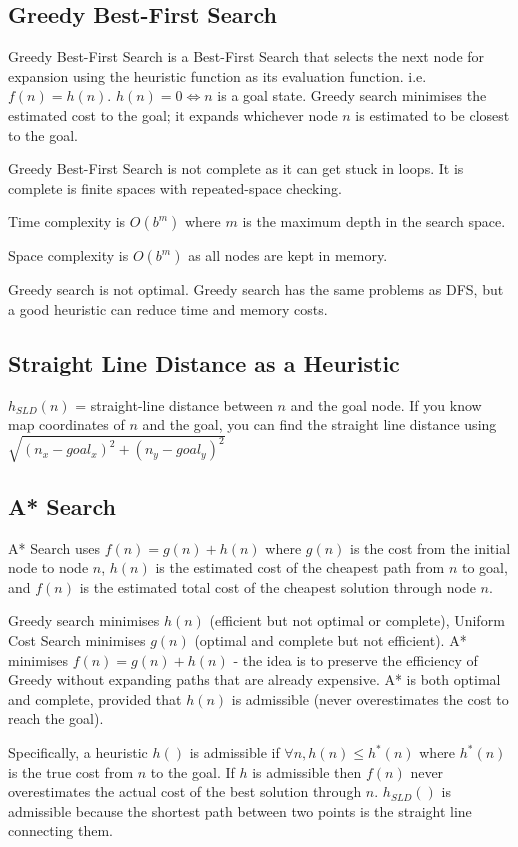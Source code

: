 \subsection{Greedy Best-First Search}
Greedy Best-First Search is a Best-First Search that selects the next node for
expansion using the heuristic function as its evaluation function. i.e. $f(n) =
h(n)$. $h(n) = 0 \Longleftrightarrow n$ is a goal state. Greedy search
minimises the estimated cost to the goal; it expands whichever node $n$ is
estimated to be closest to the goal.

Greedy Best-First Search is not complete as it can get stuck in loops. It is
complete is finite spaces with repeated-space checking.

Time complexity is $O(b^m)$ where $m$ is the maximum depth in the search space.

Space complexity is $O(b^m)$ as all nodes are kept in memory.

Greedy search is not optimal. Greedy search has the same problems as DFS, but a
good heuristic can reduce time and memory costs.

\subsection{Straight Line Distance as a Heuristic}
$h_{SLD}(n)$ = straight-line distance between $n$ and the goal node. If you
know map coordinates of $n$ and the goal, you can find the straight line
distance using $\sqrt{(n_x - goal_x)^2 + (n_y - goal_y)^2}$

\subsection{A* Search}
A* Search uses $f(n) = g(n) + h(n)$ where $g(n)$ is the cost from the initial
node to node $n$, $h(n)$ is the estimated cost of the cheapest path from $n$ to
goal, and $f(n)$ is the estimated total cost of the cheapest solution through
node $n$.

Greedy search minimises $h(n)$ (efficient but not optimal or complete), Uniform
Cost Search minimises $g(n)$ (optimal and complete but not efficient). A*
minimises $f(n) = g(n) + h(n)$ - the idea is to preserve the efficiency of
Greedy without expanding paths that are already expensive. A* is both optimal
and complete, provided that $h(n)$ is admissible (never overestimates the cost
to reach the goal).

Specifically, a heuristic $h()$ is admissible if $\forall n, h(n) \leq h^{*}(n)$
where $h^{*}(n)$ is the true cost from $n$ to the goal. If $h$ is admissible then
$f(n)$ never overestimates the actual cost of the best solution through $n$.
$h_{SLD}()$ is admissible because the shortest path between two points is the
straight line connecting them.

